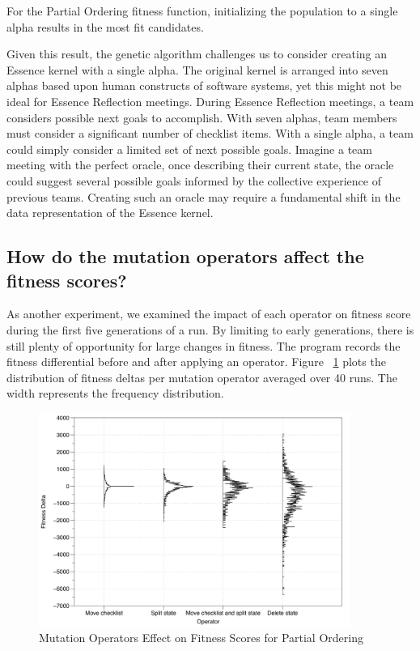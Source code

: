 \documentclass[3p,times,procedia]{elsarticle}
\begin{document}
For the Partial Ordering fitness function, initializing the population to a single alpha results in the most fit candidates. 

Given this result, the genetic algorithm challenges us to consider creating an Essence kernel with a single alpha. The original kernel is arranged into seven alphas based upon human constructs of software systems, yet this might not be ideal for Essence Reflection meetings. During Essence Reflection meetings, a team considers possible next goals to accomplish. With seven alphas, team members must consider a significant number of checklist items. With a single alpha, a team could simply consider a limited set of next possible goals. Imagine a team meeting with the perfect oracle, once describing their current state, the oracle could suggest several possible goals informed by the collective experience of previous teams. Creating such an oracle may require a fundamental shift in the data representation of the Essence kernel.

\subsection{How do the mutation operators affect the fitness scores?}
As another experiment, we examined the impact of each operator on fitness score during the first five generations of a run. By limiting to early generations, there is still plenty of opportunity for large changes in fitness. The program records the fitness differential before and after applying an operator. Figure ~\ref{OperatorsPartialOrdering} plots the distribution of fitness deltas per mutation operator averaged over 40 runs. The width represents the frequency distribution.

\begin{figure}[ht]\vspace*{4pt}
\centerline{\includegraphics[width=4.0in]{images/operator_analysis_partial_order_first_5_gens}}
\caption{Mutation Operators Effect on Fitness Scores for Partial Ordering}\vspace*{-6pt}
\label{OperatorsPartialOrdering}
\end{figure}
\end{document}
